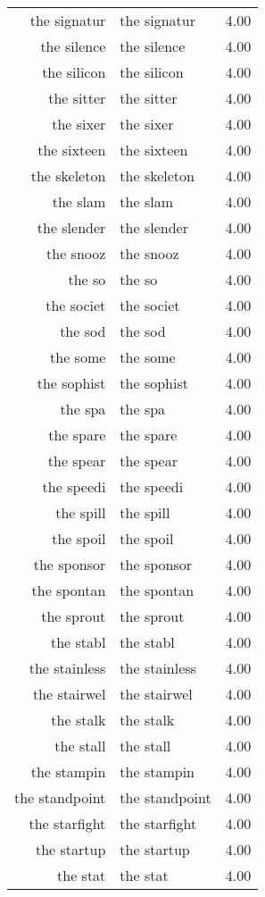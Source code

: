 \begin{table}[ht]
\begin{tabular}{rlr}
  the signatur & the signatur & 4.00 \\ 
  the silence & the silence & 4.00 \\ 
  the silicon & the silicon & 4.00 \\ 
  the sitter & the sitter & 4.00 \\ 
  the sixer & the sixer & 4.00 \\ 
  the sixteen & the sixteen & 4.00 \\ 
  the skeleton & the skeleton & 4.00 \\ 
  the slam & the slam & 4.00 \\ 
  the slender & the slender & 4.00 \\ 
  the snooz & the snooz & 4.00 \\ 
  the so & the so & 4.00 \\ 
  the societ & the societ & 4.00 \\ 
  the sod & the sod & 4.00 \\ 
  the some & the some & 4.00 \\ 
  the sophist & the sophist & 4.00 \\ 
  the spa & the spa & 4.00 \\ 
  the spare & the spare & 4.00 \\ 
  the spear & the spear & 4.00 \\ 
  the speedi & the speedi & 4.00 \\ 
  the spill & the spill & 4.00 \\ 
  the spoil & the spoil & 4.00 \\ 
  the sponsor & the sponsor & 4.00 \\ 
  the spontan & the spontan & 4.00 \\ 
  the sprout & the sprout & 4.00 \\ 
  the stabl & the stabl & 4.00 \\ 
  the stainless & the stainless & 4.00 \\ 
  the stairwel & the stairwel & 4.00 \\ 
  the stalk & the stalk & 4.00 \\ 
  the stall & the stall & 4.00 \\ 
  the stampin & the stampin & 4.00 \\ 
  the standpoint & the standpoint & 4.00 \\ 
  the starfight & the starfight & 4.00 \\ 
  the startup & the startup & 4.00 \\ 
  the stat & the stat & 4.00 \\ 

\end{tabular}
\end{table}
